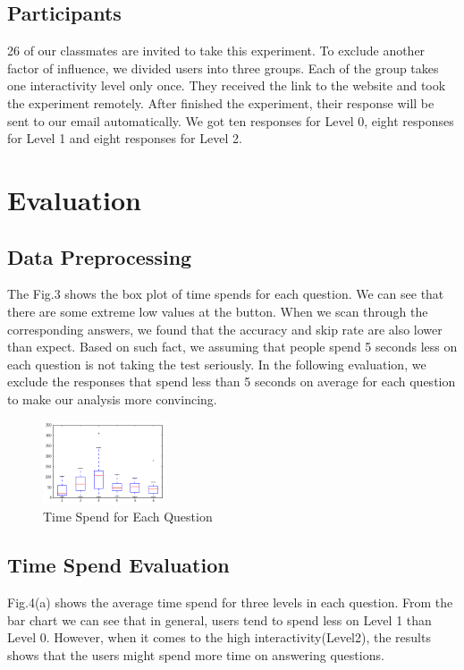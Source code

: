 \documentclass[9pt,journal,compsoc]{IEEEtran}
\begin{document}
\subsection{Participants}
26 of our classmates are invited to take this experiment. To exclude another factor of influence, we divided users into three groups. Each of the group takes one interactivity level only once. They received the link to the website and took the experiment remotely. After finished the experiment, their response will be sent to our email automatically. We got ten responses for Level 0, eight responses for Level 1 and eight responses for Level 2.

\section{Evaluation}
\large
\subsection{Data Preprocessing}
The Fig.3 shows the box plot of time spends for each question. We can see that there are some extreme low values at the button. When we scan through the corresponding answers, we found that the accuracy and skip rate are also lower than expect. Based on such fact, we assuming that people spend 5 seconds less on each question is not taking the test seriously. In the following evaluation, we exclude the responses that spend less than 5 seconds on average for each question to make our analysis more convincing.
\begin{figure} [H]
  \centering
  \includegraphics[width=0.32\textwidth]{TimeSpendBox.PNG}
  \caption{Time Spend for Each Question}
  \label{fig:6}
\end{figure}
\subsection{Time Spend Evaluation}
Fig.4(a) shows the average time spend for three levels in each question. From the bar chart we can see that in general, users tend to spend less on Level 1 than Level 0. However, when it comes to the high interactivity(Level2), the results shows that the users might spend more time on answering questions.
\end{document}
